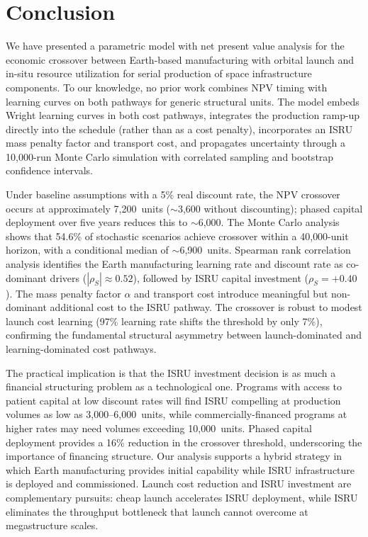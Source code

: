 \documentclass[preprint,12pt]{elsarticle}
\begin{document}
\section{Conclusion}
\label{sec:conclusion}

We have presented a parametric model with net present value analysis for the economic crossover between Earth-based manufacturing with orbital launch and in-situ resource utilization for serial production of space infrastructure components. To our knowledge, no prior work combines NPV timing with learning curves on both pathways for generic structural units. The model embeds Wright learning curves in both cost pathways, integrates the production ramp-up directly into the schedule (rather than as a cost penalty), incorporates an ISRU mass penalty factor and transport cost, and propagates uncertainty through a 10{,}000-run Monte Carlo simulation with correlated sampling and bootstrap confidence intervals.

Under baseline assumptions with a 5\% real discount rate, the NPV crossover occurs at approximately 7{,}200~units ($\sim$3{,}600 without discounting); phased capital deployment over five years reduces this to $\sim$6{,}000. The Monte Carlo analysis shows that 54.6\% of stochastic scenarios achieve crossover within a 40{,}000-unit horizon, with a conditional median of $\sim$6{,}900~units. Spearman rank correlation analysis identifies the Earth manufacturing learning rate and discount rate as co-dominant drivers ($|\rho_S| \approx 0.52$), followed by ISRU capital investment ($\rho_S = +0.40$). The mass penalty factor $\alpha$ and transport cost introduce meaningful but non-dominant additional cost to the ISRU pathway. The crossover is robust to modest launch cost learning (97\% learning rate shifts the threshold by only 7\%), confirming the fundamental structural asymmetry between launch-dominated and learning-dominated cost pathways.

The practical implication is that the ISRU investment decision is as much a financial structuring problem as a technological one. Programs with access to patient capital at low discount rates will find ISRU compelling at production volumes as low as 3{,}000--6{,}000~units, while commercially-financed programs at higher rates may need volumes exceeding 10{,}000~units. Phased capital deployment provides a 16\% reduction in the crossover threshold, underscoring the importance of financing structure. Our analysis supports a hybrid strategy in which Earth manufacturing provides initial capability while ISRU infrastructure is deployed and commissioned. Launch cost reduction and ISRU investment are complementary pursuits: cheap launch accelerates ISRU deployment, while ISRU eliminates the throughput bottleneck that launch cannot overcome at megastructure scales.
\end{document}
